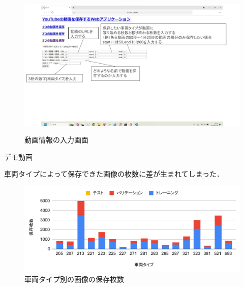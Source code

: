 
\begin{figure}
	\centering
	\includegraphics[width=0.65\linewidth]{../paper/chap3/fig/django}
	\label{fig:django}
	\caption{動画情報の入力画面}
\end{figure}

デモ動画
\href{run:./fig/demo1.mp4}{\textcolor[hsb]{0.0, 0.7, 1.0}{\faPlayCircle[regular]}} 

車両タイプによって保存できた画像の枚数に差が生まれてしまった．

\begin{figure}
	\centering
	\includegraphics[width=0.7\linewidth]{fig/chart2}
	\caption{車両タイプ別の画像の保存枚数}
	\label{fig:chart2}
\end{figure}




